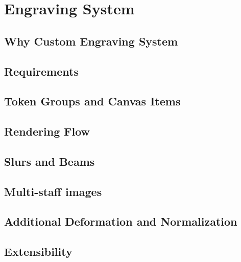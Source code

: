 \chapter{Engraving System}
\label{chap:EngravingSystem}

\section{Why Custom Engraving System}

\section{Requirements}

\section{Token Groups and Canvas Items}

\section{Rendering Flow}

\section{Slurs and Beams}

\section{Multi-staff images}

\section{Additional Deformation and Normalization}

\section{Extensibility}
